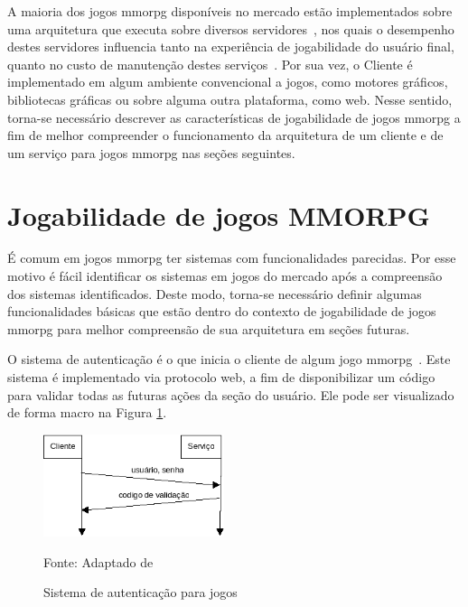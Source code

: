 A maioria dos jogos \ac{mmorpg} disponíveis no mercado estão implementados sobre uma arquitetura que executa sobre diversos servidores~\cite{stephenclarkewillson2017}, nos quais o desempenho destes servidores influencia tanto na experiência de jogabilidade do usuário final, quanto no custo de manutenção destes serviços~\cite{1417630}.
%
Por sua vez, o Cliente é implementado em algum ambiente convencional a jogos, como motores gráficos, bibliotecas gráficas ou sobre alguma outra plataforma, como web.
%
Nesse sentido, torna-se necessário descrever as características de jogabilidade de jogos \ac{mmorpg} a fim de melhor compreender o funcionamento da arquitetura de um cliente e de um serviço para jogos \ac{mmorpg} nas seções seguintes. %


\section{Jogabilidade de jogos MMORPG}
\label{sec:jogabilidade}



É comum em jogos \ac{mmorpg} ter sistemas com funcionalidades parecidas.
%
Por esse motivo é fácil identificar os sistemas em jogos do mercado após a compreensão dos sistemas identificados.
%
Deste modo, torna-se necessário definir algumas funcionalidades básicas que estão dentro do contexto de jogabilidade de jogos \ac{mmorpg} para melhor compreensão de sua arquitetura em seções futuras.


O sistema de autenticação é o que inicia o cliente de algum jogo \ac{mmorpg}~\cite{albion_online_unite, matthiasrudy2011}.
%
Este sistema é implementado via protocolo web, a fim de disponibilizar um código para validar todas as futuras ações da seção do usuário.
%
Ele pode ser visualizado de forma macro na Figura \ref{fig:autenticacao}.

\begin{figure}[htb!]
\caption{Sistema de autenticação para jogos}
\label{fig:autenticacao}
\includegraphics[height=3cm]{img/cap2/autenticacao.png}
\centering

Fonte: Adaptado de ~\cite{LeckyThompson2008Nov}
\end{figure}


